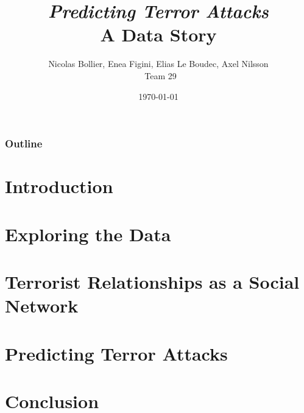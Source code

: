 \documentclass{beamer}
\title{\textit{Predicting Terror Attacks} \\A Data Story}
\author{Nicolas Bollier, Enea Figini, Elias Le Boudec, Axel Nilsson\\~Team 29}
\date{\today}
\begin{document}
\frame{\titlepage}

\begin{frame}
\frametitle{Outline}
\tableofcontents
\end{frame}


\section{Introduction}



\section{Exploring the Data}


\section{Terrorist Relationships as a Social Network}


\section{Predicting Terror Attacks}


\section{Conclusion}

\end{document}
